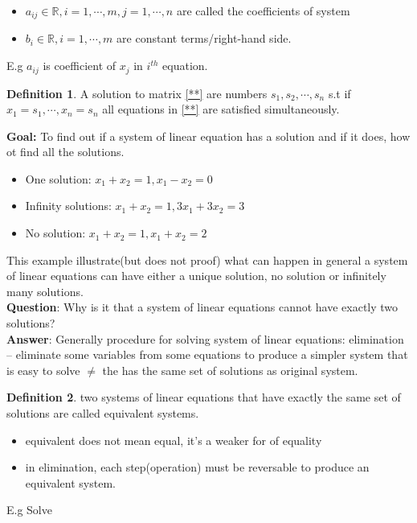 \documentclass{article}
\theoremstyle{definition}
\newtheorem{definition}{Definition}[section]
\theoremstyle{thrm}
\begin{document}
\begin{itemize}
	\item $a_{ij} \in \mathbb{R}, i = 1,\cdots, m, j = 1,\cdots,n$ are called the coefficients of system
	\item $b_i \in \mathbb{R}, i = 1,\cdots, m $ are constant terms/right-hand side.
\end{itemize}
E.g $a_{ij}$ is coefficient of $x_j$ in $i^{th}$ equation.
\begin{definition}
	A solution to matrix \ref{**} are numbers $s_1, s_2,\cdots,s_n$ s.t if $x_1=s_1,\cdots, x_n=s_n$ all equations in \ref{**} are satisfied simultaneously.
\end{definition}
\textbf{Goal:} To find out if a system of linear equation has a solution and if it does, how ot find all the solutions.
\begin{itemize}
	\item One solution: $x_1+x_2=1, x_1-x_2=0$
	\item Infinity solutions: $x_1+x_2=1, 3x_1+3x_2=3$
	\item No solution: $x_1+x_2=1, x_1+x_2=2$
\end{itemize}
This example illustrate(but does not proof) what can happen in general a system of linear equations can have either a unique solution, no solution or infinitely many solutions. \\
\textbf{Question}: Why is it that a system of linear equations cannot have exactly two solutions?\\
\textbf{Answer}: Generally procedure for solving system of linear equations: elimination  -- eliminate some variables from some equations to produce a simpler system that is easy to solve $\neq$  the has the same set of solutions as original system.
\begin{definition}
	two systems of linear equations that have exactly the same set of solutions are called equivalent systems.
\end{definition}
\begin{itemize}
	\item equivalent does not mean equal, it's a weaker for of equality
	\item in elimination, each step(operation) must be reversable to produce an equivalent system.
\end{itemize}
E.g Solve\\
{
\\}
\end{document}
